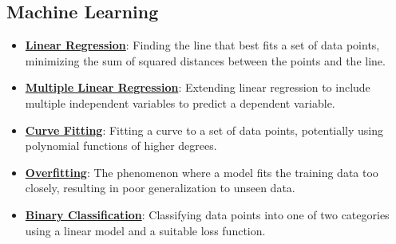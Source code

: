 \documentclass{article}%
\begin{document}
\subsection{Machine Learning}%
\label{subsec:MachineLearning}%
\begin{itemize}[leftmargin=*]%
\item \href{https://purdue.brightspace.com/d2l/common/assets/pdfjs-d2l-dist/1.0.14-legacy/web/viewer.html?file=%2Fcontent%2Fenforced%2F1095467-wl.202510.CS.24300.001%2F05L2-ML Basics.pdf%3Fou%3D1095467&lang=en-us&container=d2l-fileviewer-rendered-pdf&fullscreen=d2l-fileviewer-rendered-pdf-dialog&height=667#page=6}{\textbf{Linear Regression}}: Finding the line that best fits a set of data points, minimizing the sum of squared distances between the points and the line.%
\item \href{https://purdue.brightspace.com/d2l/common/assets/pdfjs-d2l-dist/1.0.14-legacy/web/viewer.html?file=%2Fcontent%2Fenforced%2F1095467-wl.202510.CS.24300.001%2F05L2-ML Basics.pdf%3Fou%3D1095467&lang=en-us&container=d2l-fileviewer-rendered-pdf&fullscreen=d2l-fileviewer-rendered-pdf-dialog&height=667#page=11}{\textbf{Multiple Linear Regression}}: Extending linear regression to include multiple independent variables to predict a dependent variable.%
\item \href{https://purdue.brightspace.com/d2l/common/assets/pdfjs-d2l-dist/1.0.14-legacy/web/viewer.html?file=%2Fcontent%2Fenforced%2F1095467-wl.202510.CS.24300.001%2F05L2-ML Basics.pdf%3Fou%3D1095467&lang=en-us&container=d2l-fileviewer-rendered-pdf&fullscreen=d2l-fileviewer-rendered-pdf-dialog&height=667#page=13}{\textbf{Curve Fitting}}: Fitting a curve to a set of data points, potentially using polynomial functions of higher degrees.%
\item \href{https://purdue.brightspace.com/d2l/common/assets/pdfjs-d2l-dist/1.0.14-legacy/web/viewer.html?file=%2Fcontent%2Fenforced%2F1095467-wl.202510.CS.24300.001%2F05L2-ML Basics.pdf%3Fou%3D1095467&lang=en-us&container=d2l-fileviewer-rendered-pdf&fullscreen=d2l-fileviewer-rendered-pdf-dialog&height=667#page=14}{\textbf{Overfitting}}: The phenomenon where a model fits the training data too closely, resulting in poor generalization to unseen data.%
\item \href{https://purdue.brightspace.com/d2l/common/assets/pdfjs-d2l-dist/1.0.14-legacy/web/viewer.html?file=%2Fcontent%2Fenforced%2F1095467-wl.202510.CS.24300.001%2F05L2-ML Basics.pdf%3Fou%3D1095467&lang=en-us&container=d2l-fileviewer-rendered-pdf&fullscreen=d2l-fileviewer-rendered-pdf-dialog&height=667#page=20}{\textbf{Binary Classification}}: Classifying data points into one of two categories using a linear model and a suitable loss function.%

\end{itemize}
\end{document}
